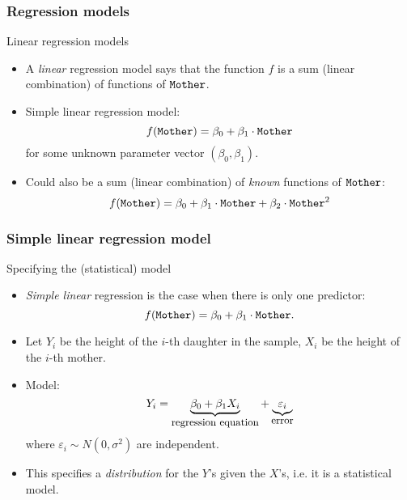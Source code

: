 \documentclass[handout]{beamer}
\begin{document}

   \begin{frame} \frametitle{Regression models}

   \begin{block}
   {Linear regression models}
   \begin{itemize}
   \item A {\em linear} regression model says that
   the function $f$ is a sum (linear combination) of functions of ${\tt Mother}$.

   \item Simple linear regression model:
   $$f({\tt Mother}) = \beta_0 + \beta_1 \cdot {\tt Mother}$$
   for some unknown parameter vector $(\beta_0, \beta_1)$.
   \item Could also be a sum (linear combination) of {\em known} functions of ${\tt Mother}$:
   $$f({\tt Mother}) = \beta_0 + \beta_1 \cdot {\tt Mother} + \beta_2 \cdot {\tt Mother}^2
   $$
   \end{itemize}
   \end{block}
   \end{frame}


   \begin{frame} \frametitle{Simple linear regression model}

   \begin{block}
   {Specifying the (statistical) model}
   \begin{itemize}
   \item
   {\em Simple linear} regression is the case when there is only one predictor:
   $$
   f({\tt Mother}) = \beta_0 + \beta_1  \cdot {\tt Mother}.$$

   \item Let $Y_i$ be the height of the $i$-th daughter in the sample, $X_i$ be the height of the $i$-th mother.


   \item Model:
   $$
   Y_i = \underbrace{\beta_0 + \beta_1 X_i}_{\text{{\small regression equation}}} + \underbrace{\varepsilon_i}_{\text{{\small error}}}$$
   where $\varepsilon_i \sim N(0, \sigma^2)$ are independent.

   \item This specifies a {\em distribution} for the $Y$'s given the $X$'s, i.e.
   it is a statistical model.

   \end{itemize}
   \end{block}
   \end{frame}
\end{document}

